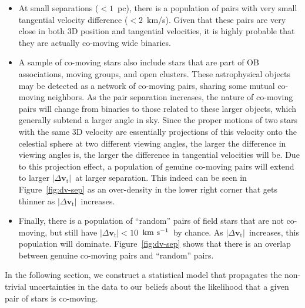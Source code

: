 \documentclass[manuscript, letterpaper]{aastex6}
\newcommand{\bs}[1]{\boldsymbol{#1}}
\renewcommand{\vec}[1]{\bs{#1}}
\newcommand{\kms}{\ensuremath{\rm km~s^{-1}}}
\newcommand{\absdvtan}{\ensuremath{|\Delta\vec v_\mathrm{t}|}}
\begin{document}
\begin{itemize}
  \item At small separations ($<1$~pc), there is a population of pairs with
    very small tangential velocity difference ($<2$~km/s). Given that these
    pairs are very close in both 3D position and tangential velocities, it is highly
    probable that they are actually co-moving wide binaries.

  \item  A sample of co-moving stars also include stars that are part of OB associations,
    moving groups, and open clusters.
    These astrophysical objects may be detected as a network of co-moving pairs,
    sharing some mutual co-moving neighbors.
    As the pair separation increases, the nature of co-moving pairs
    will change from binaries to those related to these larger objects,
    which generally subtend a larger angle in sky.
    Since the proper motions of two stars with the same 3D velocity
    are essentially projections of this velocity onto the celestial sphere at
    two different viewing angles,
    the larger the difference in viewing angles is, the larger the difference in tangential
    velocities will be.
    Due to this projection effect, a population of genuine co-moving pairs
    will extend to larger \absdvtan\ at larger separation.
    This indeed can be seen in Figure~\ref{fig:dv-sep} as an over-density
    in the lower right corner that gets thinner as \absdvtan\ increases.

  \item Finally, there is a population of “random” pairs of field stars
    that are not co-moving, but still have $\absdvtan < 10$~\kms\
    by chance.
    As \absdvtan\ increases, this population will dominate.
    Figure~\ref{fig:dv-sep} shows that there is an overlap between
    genuine co-moving pairs and “random” pairs.
\end{itemize}

In the following section, we construct a statistical model that propagates
the non-trivial uncertainties in the data to our beliefs about the likelihood
that a given pair of stars is co-moving.
\end{document}
